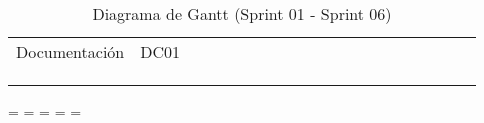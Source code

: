 \begin{longtable}[c]{llclllllllllllllllll}
        \multicolumn{1}{|l|}{Documentación}                                                                                     & \multicolumn{1}{l|}{DC01}                                                      & \multicolumn{1}{l|}{}                                                            & \multicolumn{1}{l|}{}                                                                &                                 &                                 &                                 &                                 &                                 &                                 &                                 &                                 &                                 &                                 &                                 &                                 &                                 &                                 & \multicolumn{1}{l|}{}                         &  \\ \cline{1-19}
        \multicolumn{4}{|l|}{}                                                                                                                                                                                                                                                                                                                                                             & \multicolumn{15}{l|}{}                                                                                                                                                                                                                                                                                                                                                                                                                                                                                                                    &  \\ \cline{1-19}
                                                                                                                                &                                                                                & \multicolumn{1}{l}{}                                                             &                                                                                      &                                 &                                 &                                 &                                 &                                 &                                 &                                 &                                 &                                 &                                 &                                 &                                 &                                 &                                 &                                               &  \\ \hline
        \caption{Diagrama de Gantt (Sprint 01 - Sprint 06)}
        \label{tab:Diagrama_gantt}\\
    \end{longtable}
\endgroup
\newpage
\paperwidth=\pdfpageheight
\paperheight=\pdfpagewidth
\pdfpageheight=\paperheight
\pdfpagewidth=\paperwidth
\headwidth=\textwidth

